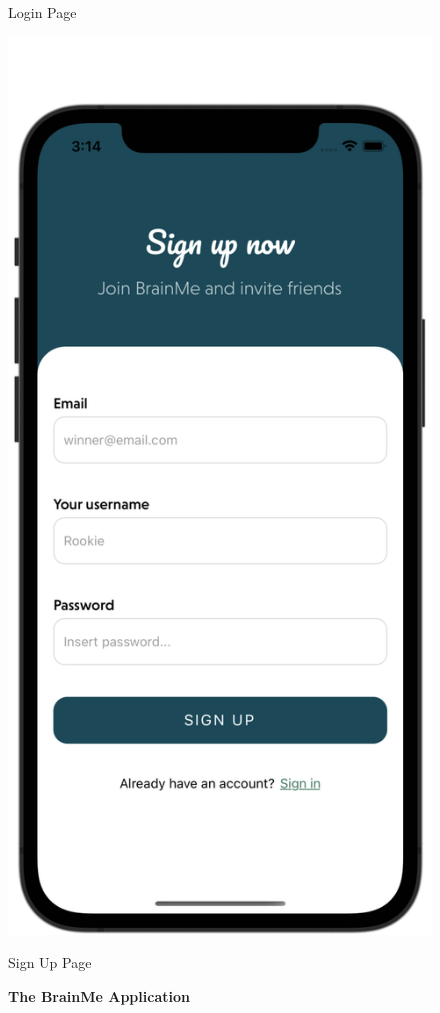 \begin{figure}[H]
\begin{minipage}[b]{0.43\linewidth}
        \caption{Login Page}
    \end{minipage}
    \hspace{0.1\linewidth}
    \begin{minipage}[b]{0.43\linewidth}
        \centering
        \includegraphics[width=\linewidth]{Mobile UI/Signup.png}
        \caption{Sign Up Page}
    \end{minipage}
    \vspace{0.5cm}
    \caption{\textbf{The BrainMe Application}}
\end{figure}

